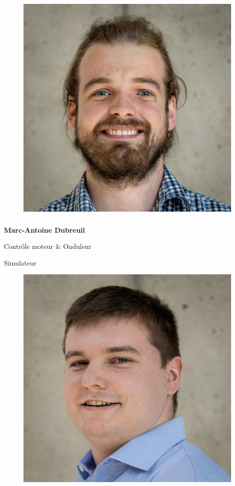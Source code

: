 \documentclass[a0paper,portrait]{baposter}
\begin{document}
\begin{poster}
{\begin{figure}
\includegraphics[width=.9\linewidth]{img/membres/Marc-Antoine-Dubreuil-2.jpg} 
\end{figure}
\subsubsection*{}
\vspace{-2mm}
\textbf{Marc-Antoine Dubreuil}

Contrôle moteur \& Onduleur

Simulateur

\begin{figure}
\includegraphics[width=.9\linewidth]{img/membres/Thomas-Chagnon-3.jpg} 
\end{figure}
}
\end{poster}
\end{document}
